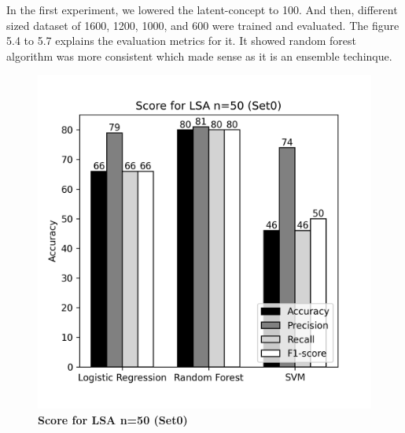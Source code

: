 \documentclass[12pt]{report}
\begin{document}
             In the first experiment, we lowered the latent-concept to 100. And then, different sized dataset of 1600, 1200, 1000, and 600 were
             trained and evaluated. The figure 5.4 to 5.7 explains the evaluation metrics for it. It showed random forest algorithm
             was more consistent which made sense as it is an ensemble techinque.



             \begin{figure}[!htb]
                \begin{minipage}{0.48\textwidth}
                  \centering
                  \includegraphics[scale=0.55]{plots/Score for LSA n=50 (Set0).png}
                  \caption{\textbf{Score for LSA n=50 (Set0)}}\label{Fig:typo1}
                \end{minipage}\hfill
                \begin{minipage}{0.48\textwidth}
                  \centering

\end{minipage}
\end{figure}
\end{document}
